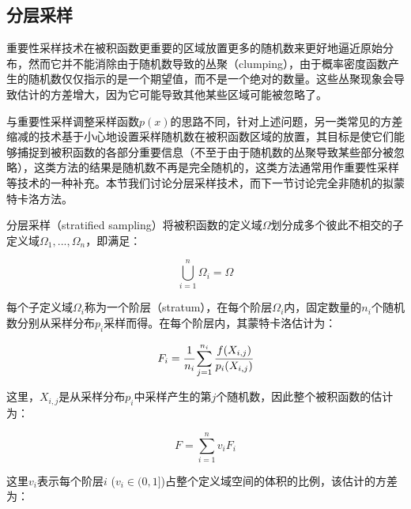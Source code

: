 \subsection{分层采样}
重要性采样技术在被积函数更重要的区域放置更多的随机数来更好地逼近原始分布，然而它并不能消除由于随机数导致的丛聚（clumping），由于概率密度函数产生的随机数仅仅指示的是一个期望值，而不是一个绝对的数量。这些丛聚现象会导致估计的方差增大，因为它可能导致其他某些区域可能被忽略了。

与重要性采样调整采样函数$p(x)$的思路不同，针对上述问题，另一类常见的方差缩减的技术基于小心地设置采样随机数在被积函数区域的放置，其目标是使它们能够捕捉到被积函数的各部分重要信息（不至于由于随机数的丛聚导致某些部分被忽略），这类方法的结果是随机数不再是完全随机的，这类方法通常用作重要性采样等技术的一种补充。本节我们讨论分层采样技术，而下一节讨论完全非随机的拟蒙特卡洛方法。

分层采样（stratified sampling）将被积函数的定义域$\Omega$划分成多个彼此不相交的子定义域$\Omega_1,...,\Omega_n$，即满足：

\begin{equation}
	\bigcup_{i=1}^{n}\Omega_i=\Omega
\end{equation}

\noindent 每个子定义域$\Omega_i$称为一个阶层（stratum），在每个阶层$\Omega_i$内，固定数量的$n_i$个随机数分别从采样分布$p_i$采样而得。在每个阶层内，其蒙特卡洛估计为：

\begin{equation}
	F_i= \cfrac{1}{n_i}\sum_{j=1}^{n_i} \cfrac{f(X_{i,j})}{p_i(X_{i,j})}
\end{equation} 

\noindent 这里，$X_{i,j}$是从采样分布$p_i$中采样产生的第$j$个随机数，因此整个被积函数的估计为：

\begin{equation}
	F=\sum_{i=1}^{n}v_iF_i
\end{equation}

\noindent 这里$v_i$表示每个阶层$i$ ($v_i\in(0,1]$)占整个定义域空间的体积的比例，该估计的方差为：

